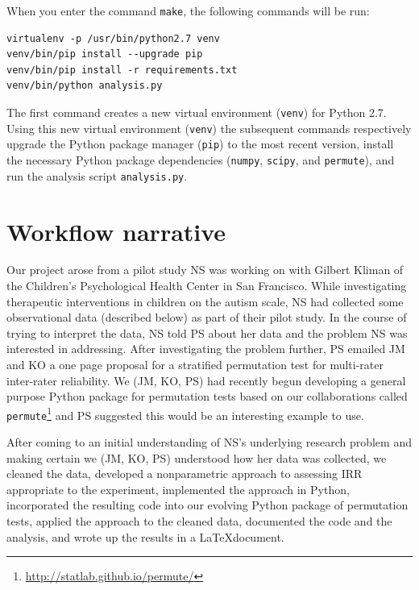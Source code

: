 \documentclass[]{article}
\begin{document}
When you enter the command \texttt{make}, the following commands will be run:
\begin{verbatim}
virtualenv -p /usr/bin/python2.7 venv
venv/bin/pip install --upgrade pip
venv/bin/pip install -r requirements.txt
venv/bin/python analysis.py
\end{verbatim}
The first command creates a new virtual environment (\texttt{venv}) for Python
2.7.
Using this new virtual environment (\texttt{venv}) the subsequent commands
respectively upgrade the Python package manager (\texttt{pip}) to the most
recent version, install the necessary Python package dependencies
(\texttt{numpy}, \texttt{scipy}, and \texttt{permute}), and run the analysis
script \texttt{analysis.py}.

\section{Workflow narrative}\label{workflow-narrative}

Our project arose from a pilot study NS was working on with Gilbert Kliman of
the Children's Psychological Health Center in San Francisco.
While investigating therapeutic interventions in children on the autism scale,
NS had collected some observational data (described below) as part of their
pilot study.
In the course of trying to interpret the data, NS told PS about her data and
the problem NS was interested in addressing.
After investigating the problem further, PS emailed JM and KO a one page
proposal for a stratified permutation test for multi-rater inter-rater
reliability.
We (JM, KO, PS) had recently begun developing a general purpose Python package
for permutation tests based on our collaborations called
\texttt{permute}\footnote{\url{http://statlab.github.io/permute/}} and PS
suggested this would be an interesting example to use.

After coming to an initial understanding of NS's underlying research problem
and making certain we (JM, KO, PS) understood how her data was collected, we
cleaned the data, developed a nonparametric approach to assessing IRR
appropriate to the experiment, implemented the approach in Python, incorporated
the resulting code into our evolving Python package of permutation tests,
applied the approach to the cleaned data, documented the code and the analysis,
and wrote up the results in a \LaTeX document. 
\end{document}
